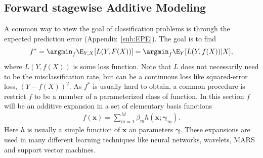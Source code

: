 \subsection{Forward stagewise Additive Modeling}
\label{sub:Forward stagewise additive modeling}
A common way to view the goal of classification problems is through the expected prediction error (Appendix~\ref{sub:EPE}). The goal is to find
\begin{align}
  \label{eq:fargmin} 
  f^* = \argmin_f \E_{Y, X}[L(Y,F(X))] = \argmin_f \E_Y [L(Y,f(X))|X] ,
\end{align}
where $L(Y, f(X))$ is some loss function. Note that $L$ does not necessarily need to be the misclassification rate, but can be a continuous loss like squared-error loss, $(Y - f(X))^2$. As $f^*$ is usually hard to obtain, a common procedure is restrict $f$ to be a member of a parameterized class of function. In this section $f$ will be an additive expansion in a set of elementary basis functions 
\begin{align}
  \label{eq:additive} 
  f(\mathbf{x}) =  \sum^{M}_{m=1} \beta_m h(\mathbf{x}; \bm{\gamma}_m).
\end{align}
Here $h$ is usually a simple function of $\mathbf{x}$ an parameters $\bm{\gamma}$. These expansions are used in many different learning techniques like neural networks, wavelets, MARS and support vector machines.

